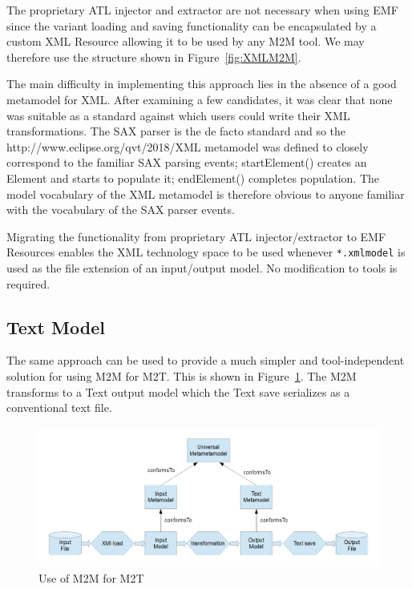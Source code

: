 \documentclass{llncs}
\begin{document}
The proprietary ATL injector and extractor are not necessary when using EMF since the variant loading and saving functionality can be encapsulated by a custom XML Resource allowing it to be used by any M2M tool. We may therefore use the structure shown in Figure~\ref{fig:XMLM2M}.

The main difficulty in implementing this approach lies in the absence of a good metamodel for XML. After examining a few candidates, it was clear that none was suitable as a standard against which users could write their XML transformations. The SAX parser \cite{SAXparser} is the de facto standard and so the http://www.eclipse.org/qvt/2018/XML metamodel was defined to closely correspond to the familiar SAX parsing events; startElement() creates an Element and starts to populate it; endElement() completes population. The model vocabulary of the XML metamodel is therefore obvious to anyone familiar with the vocabulary of the SAX parser events.

Migrating the functionality from proprietary ATL injector/extractor to EMF Resources enables the XML technology space to be used whenever \verb$*.xmlmodel$ is used as the file extension of an input/output model. No modification to tools is required. %

\subsection{Text Model}\label{Text Model}

The same approach can be used to provide a much simpler and tool-independent solution for using M2M for M2T. This is shown in Figure~\ref{fig:TextM2M}. The M2M transforms to a Text output model which the Text save serializes as a conventional text file.

\begin{figure}
	\begin{center}
		\includegraphics[width=4.9in]{TextM2M.png}
	\end{center}
	\caption{Use of M2M for M2T}
	\label{fig:TextM2M}
\end{figure}
\end{document}

